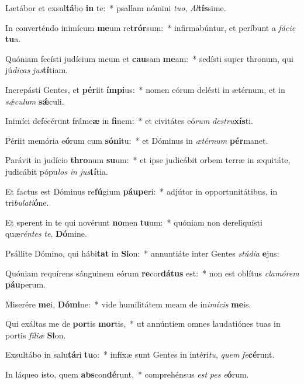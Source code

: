 \item Lætábor et exsul\textbf{tá}bo \textbf{in} te:~* psallam nómini \textit{tu}\textit{o}, \textit{Al}\textbf{tís}sime.
\item In converténdo inimícum \textbf{me}um re\textbf{trór}sum:~* infirmabúntur, et períbunt a \textit{fá}\textit{ci}\textit{e} \textbf{tu}a.
\item Quóniam fecísti judícium meum et \textbf{cau}sam \textbf{me}am:~* sedísti super thronum, qui jú\textit{di}\textit{cas} \textit{jus}\textbf{tí}tiam.
\item Increpásti Gentes, et \textbf{pér}iit \textbf{ím}\textbf{pi}us:~* nomen eórum delésti in ætérnum, et in \textit{sǽ}\textit{cu}\textit{lum} \textbf{sǽ}culi.
\item Inimíci defecérunt fráme\textbf{æ} in \textbf{fi}nem:~* et civitátes eó\textit{rum} \textit{de}\textit{stru}\textbf{xís}ti.
\item Périit memória e\textbf{ó}rum cum \textbf{só}\textbf{ni}tu:~* et Dóminus in \textit{æ}\textit{tér}\textit{num} \textbf{pér}manet.
\item Parávit in judício \textbf{thro}num \textbf{su}um:~* et ipse judicábit orbem terræ in æquitáte, judicábit pópu\textit{los} \textit{in} \textit{jus}\textbf{tí}tia.
\item Et factus est Dóminus re\textbf{fú}gium \textbf{páu}\textbf{pe}ri:~* adjútor in opportunitátibus, in tri\textit{bu}\textit{la}\textit{ti}\textbf{ó}ne.
\item Et sperent in te qui novérunt \textbf{no}men \textbf{tu}um:~* quóniam non dereliquísti quæ\textit{rén}\textit{tes} \textit{te}, \textbf{Dó}mine.
\item Psállite Dómino, qui hábi\textbf{tat} in \textbf{Si}on:~* annuntiáte inter Gentes \textit{stú}\textit{di}\textit{a} \textbf{e}jus:
\item Quóniam requírens sánguinem eórum \textbf{re}cor\textbf{dá}\textbf{tus} est:~* non est oblítus \textit{cla}\textit{mó}\textit{rem} \textbf{páu}perum.
\item Miserére \textbf{me}i, \textbf{Dó}\textbf{mi}ne:~* vide humilitátem meam de in\textit{i}\textit{mí}\textit{cis} \textbf{me}is.
\item Qui exáltas me de \textbf{por}tis \textbf{mor}tis,~* ut annúntiem omnes laudatiónes tuas in portis \textit{fí}\textit{li}\textit{æ} \textbf{Si}on.
\item Exsultábo in salu\textbf{tá}ri \textbf{tu}o:~* infíxæ sunt Gentes in intéri\textit{tu}, \textit{quem} \textit{fe}\textbf{cé}runt.
\item In láqueo isto, quem \textbf{abs}con\textbf{dé}runt,~* comprehénsus \textit{est} \textit{pes} \textit{e}\textbf{ó}rum.

